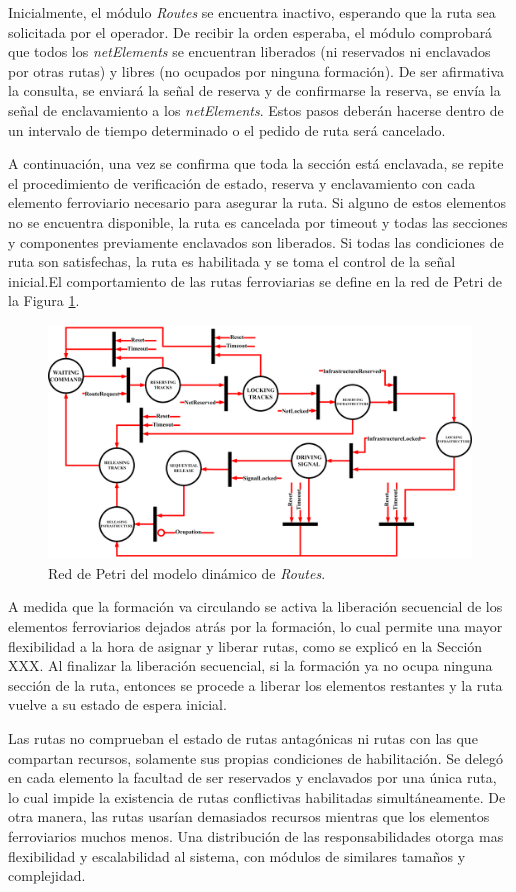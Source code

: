 Inicialmente, el módulo \textit{Routes} se encuentra inactivo, esperando que la ruta sea solicitada por el operador. De recibir la orden esperaba, el módulo comprobará que todos los \textit{netElements} se encuentran liberados (ni reservados ni enclavados por otras rutas) y libres (no ocupados por ninguna formación). De ser afirmativa la consulta, se enviará la señal de reserva y de confirmarse la reserva, se envía la señal de enclavamiento a los \textit{netElements}. Estos pasos deberán hacerse dentro de un intervalo de tiempo determinado o el pedido de ruta será cancelado.

A continuación, una vez se confirma que toda la sección está enclavada, se repite el procedimiento de verificación de estado, reserva y enclavamiento con cada elemento ferroviario necesario para asegurar la ruta. Si alguno de estos elementos no se encuentra disponible, la ruta es cancelada por timeout y todas las secciones y componentes previamente enclavados son liberados. Si todas las condiciones de ruta son satisfechas, la ruta es habilitada y se toma el control de la señal inicial.El comportamiento de las rutas ferroviarias se define en la red de Petri de la Figura \ref{fig:RTS_Petri}.

\begin{figure}[H]
	\centering
	\includegraphics[width=1\textwidth]{Figuras/RTS_petri}
	\centering\caption{Red de Petri del modelo dinámico de \textit{Routes}.}
	\label{fig:RTS_Petri}
\end{figure}

A medida que la formación va circulando se activa la liberación secuencial de los elementos ferroviarios dejados atrás por la formación, lo cual permite una mayor flexibilidad a la hora de asignar y liberar rutas, como se explicó en la Sección XXX. Al finalizar la liberación secuencial, si la formación ya no ocupa ninguna sección de la ruta, entonces se procede a liberar los elementos restantes y la ruta vuelve a su estado de espera inicial.

Las rutas no comprueban el estado de rutas antagónicas ni rutas con las que compartan recursos, solamente sus propias condiciones de habilitación. Se delegó en cada elemento la facultad de ser reservados y enclavados por una única ruta, lo cual impide la existencia de rutas conflictivas habilitadas simultáneamente. De otra manera, las rutas usarían demasiados recursos mientras que los elementos ferroviarios muchos menos. Una distribución de las responsabilidades otorga mas flexibilidad y escalabilidad al sistema, con módulos de similares tamaños y complejidad.